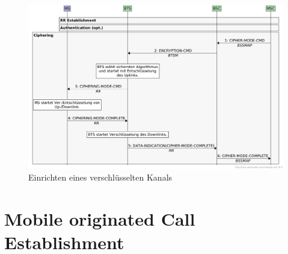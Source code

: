 \begin{figure}[H]
  \begin{center}
    \includegraphics[width=1.00\textwidth]{figures/gsm_ciphering.pdf}
  \end{center}
  \caption[Einrichten eines verschlüsselten Kanals]{Einrichten eines verschlüsselten Kanals} \label{fig:ciphering}
\end{figure}

\section{Mobile originated Call Establishment} \label{hdl:grundlagen_ablufe}




